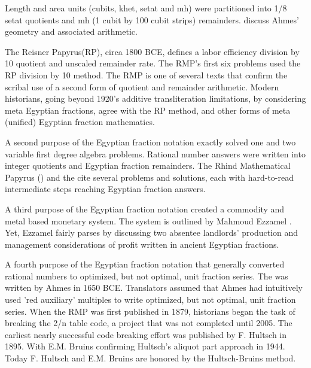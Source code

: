 \documentclass[12pt]{article}
\begin{document}
Length and area units (cubits, khet, setat and mh) were partitioned into 1/8 setat quotients and mh (1 cubit by 100 cubit strips) remainders.  discuss Ahmes' geometry and associated arithmetic.

The Reisner Papyrus(RP), circa 1800 BCE, defines a labor efficiency division by 10 quotient and unscaled remainder rate. The RMP's first six problems used the RP division by 10 method. The RMP is one of several texts that confirm the scribal use of a second form of quotient and remainder arithmetic. Modern historians, going beyond 1920's additive transliteration limitations, by considering meta Egyptian fractions, agree with the RP method, and other forms of meta (unified) Egyptian fraction mathematics.  

A second purpose of the Egyptian fraction notation exactly solved one and two variable first degree algebra problems. Rational number answers were written into integer quotients and Egyptian fraction remainders. The Rhind Mathematical Papyrus () and the  cite several problems and solutions, each with hard-to-read intermediate steps reaching Egyptian fraction answers.

A third purpose of the Egyptian fraction notation created a commodity and metal based monetary system. The system is outlined by Mahmoud Ezzamel . Yet, Ezzamel fairly parses  by discussing two absentee landlords' production and management considerations of profit written in ancient Egyptian fractions.

A fourth purpose of the Egyptian fraction notation that generally converted rational numbers to optimized, but not optimal, unit fraction series. The  was written by Ahmes in 1650 BCE. Translators assumed that Ahmes had intuitively used 'red auxiliary' multiples to write optimized, but not optimal, unit fraction series. When the RMP was first published in 1879, historians began the task of breaking the 2/n table code, a project that was not completed until 2005. The earliest nearly successful code breaking effort was published by F. Hultsch in 1895. With E.M. Bruins confirming Hultsch's aliquot part approach in 1944. Today F. Hultsch and E.M. Bruins are honored by the Hultsch-Bruins method.
\end{document}

